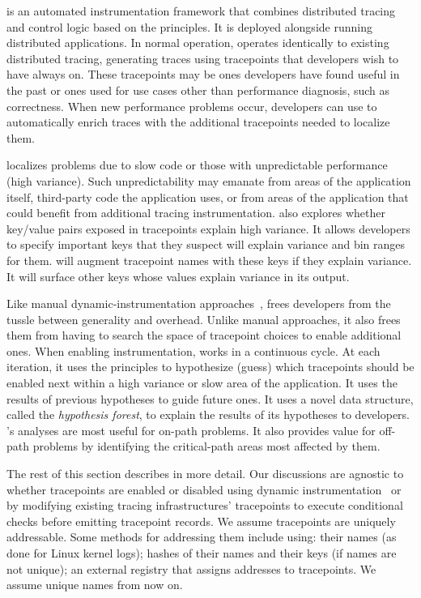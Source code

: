 \STAIF{} is an automated instrumentation framework that combines
distributed tracing and control logic based on the principles.  It is
deployed alongside running distributed applications.  In normal
operation, \STAIF{} operates identically to existing distributed
tracing, generating traces using tracepoints that developers wish to
have always on.  These tracepoints may be ones developers have found
useful in the past or ones used for use cases other than performance
diagnosis, such as correctness.  When new performance problems occur,
developers can use \STAIF{} to automatically enrich traces with the
additional tracepoints needed to localize them.

\STAIF{} localizes problems due to slow code or those with
unpredictable performance (high variance).  Such unpredictability may
emanate from areas of the application itself, third-party code the
application uses, or from areas of the application that could benefit
from additional tracing instrumentation. \STAIF{}
also explores whether key/value pairs exposed in tracepoints explain
high variance.  It allows developers to specify important keys that
they suspect will explain variance and bin ranges for them.  \STAIF{}
will augment tracepoint names with these keys if they explain
variance.  It will surface other keys whose values explain variance in
its output.

Like manual dynamic-instrumentation
approaches~\cite{Erlingsson:2011wy, Mace:2015uh}, \STAIF{} frees
developers from the tussle between generality and overhead.  Unlike
manual approaches, it also frees them from having to search the space
of tracepoint choices to enable additional ones.  When enabling
instrumentation, \STAIF{} works in a continuous cycle.  At each
iteration, it uses the principles to hypothesize (guess) which
tracepoints should be enabled next within a high variance or slow area
of the application.  It uses the results of previous hypotheses to
guide future ones.  It uses a novel data structure, called
the \textit{hypothesis forest}, to explain the results of its
hypotheses to developers.  \STAIF{}'s analyses are most useful for
on-path problems.  It also provides value for off-path problems by
identifying the critical-path areas most affected by them.

%
The rest of this section describes \STAIF{} in more detail.  
Our discussions are agnostic to whether tracepoints are enabled or
disabled using dynamic instrumentation~\cite{Erlingsson:2011wy,
Cantrill:2004dtrace, Mace:2015uh} or by modifying existing tracing
infrastructures' tracepoints to execute conditional checks before
emitting tracepoint records.  We assume tracepoints are uniquely
addressable.  Some methods for addressing them include using: their
names (as done for Linux kernel logs); hashes of their names and their
keys (if names are not unique); an external registry that assigns
addresses to tracepoints.  We assume unique names from now on.


